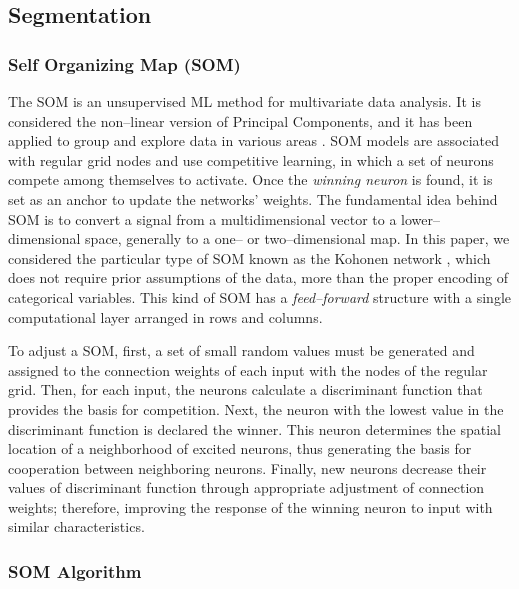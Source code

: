 \documentclass[5p,authoryear,preprint,12pt]{elsarticle}
\begin{document}
\subsection{Segmentation}
\subsubsection{Self Organizing Map (SOM)}

The SOM is an unsupervised ML method for multivariate data analysis. It is considered the non--linear version of Principal Components, and it has been applied to group and explore data in various areas \citep{kohonen2013essentials}. SOM models are associated with regular grid nodes and use competitive learning, in which a set of neurons compete among themselves to activate. Once the \emph{winning neuron} is found, it is set as an anchor to update the networks' weights. The fundamental idea behind SOM is to convert a signal from a multidimensional vector to a lower--dimensional space, generally to a one-- or two--dimensional map. In this paper, we considered the particular type of SOM known as the Kohonen network \citep{kohonen1982self,kohonen2013essentials}, which does not require prior assumptions of the data, more than the proper encoding of categorical variables. This kind of SOM has a \emph{feed--forward} structure with a single computational layer arranged in rows and columns.

To adjust a SOM, first, a set of small random values must be generated and assigned to the connection weights of each input with the nodes of the regular grid. Then, for each input, the neurons calculate a discriminant function that provides the basis for competition. Next, the neuron with the lowest value in the discriminant function is declared the winner. This neuron determines the spatial location of a neighborhood of excited neurons, thus generating the basis for cooperation between neighboring neurons. Finally, new neurons decrease their values of discriminant function through appropriate adjustment of connection weights; therefore, improving the response of the winning neuron to input with similar characteristics.

\subsubsection{SOM Algorithm}\hspace{1cm}
\end{document}

